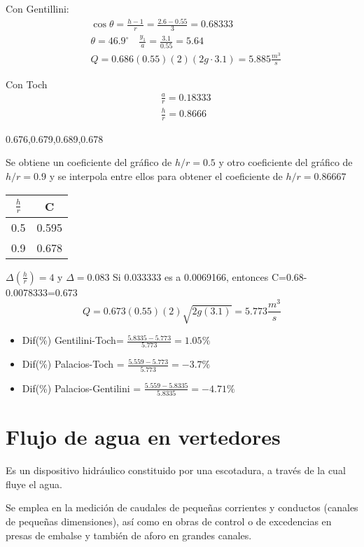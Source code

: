 Con Gentillini:
\begin{align*}
    &\cos{\theta} = \frac{h- 1}{r} = \frac{2.6 -0.55}{3} = 0.68333\\
    &\theta = 46.9^{\circ}\quad \frac{y_1}{a} = \frac{3.1}{0.55} =5.64\\
    &Q = 0.686(0.55)(2)(2g\cdot 3.1) = 5.885 \frac{m^3}{s}
\end{align*}

Con Toch
\begin{align*}
    &\frac{a}{r} = 0.18333\\
    &\frac{h}{r} = 0.8666
\end{align*}

0.676,0.679,0.689,0.678

Se obtiene un coeficiente del gráfico de $h/r=0.5$ y otro coeficiente del gráfico de $h/r=0.9$ y se interpola entre ellos para obtener el coeficiente de $h/r=0.86667$

\begin{table}[h!]
    \centering\begin{tabular}{@{}cc@{}}
    \toprule
    $\frac{h}{r}$ & C     \\ \midrule
    0.5           & 0.595 \\
    0.9           & 0.678 \\ \bottomrule
    \end{tabular}
    \label{tabhb5}
    \end{table}
$\Delta \left(\frac{h}{r}\right)=4$ y $\Delta = 0.083$
Si 0.033333 es a 0.0069166, entonces C=0.68-0.0078333=0.673
\begin{equation*}
    Q = 0.673(0.55)(2)\sqrt{2g(3.1)} =5.773 \frac{m^3}{s}
\end{equation*}
\begin{itemize}
    \item Dif(\%) Gentilini-Toch= $\frac{5.8335-5.773}{5.773}=1.05\%$
    \item Dif(\%) Palacios-Toch = $\frac{5.559-5.773}{5.773}=-3.7\%$
    \item Dif(\%) Palacios-Gentilini = $\frac{5.559-5.8335}{5.8335}=-4.71\%$
\end{itemize}

\section{Flujo de agua en vertedores}

\begin{definition}[Vertedor]
    Es un dispositivo hidráulico constituido por una escotadura, a través de la cual fluye el agua.
\end{definition}
Se emplea en la medición de caudales de pequeñas corrientes y conductos (canales de pequeñas dimensiones), así como en obras de control o de excedencias en presas de embalse y también de aforo en grandes canales.

